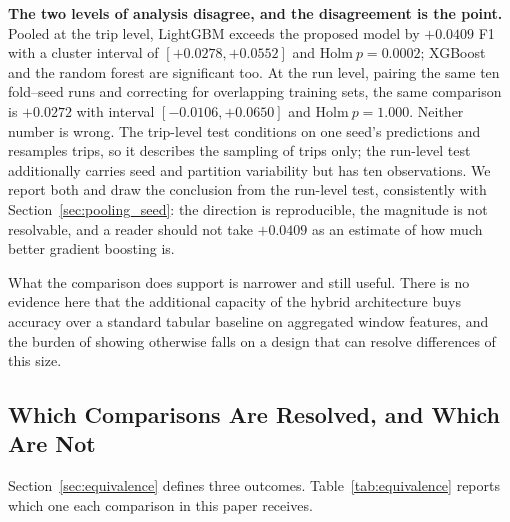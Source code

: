 \documentclass[journal]{IEEEtran}
\begin{document}
\textbf{The two levels of analysis disagree, and the disagreement is the
point.} Pooled at the trip level, LightGBM exceeds the proposed model by
$+0.0409$ F1 with a cluster interval of $[+0.0278, +0.0552]$ and
$\mathrm{Holm}\ p = 0.0002$; XGBoost and the random forest are significant
too. At the run level, pairing the same ten fold--seed runs and correcting for
overlapping training sets, the same comparison is $+0.0272$ with interval
$[-0.0106, +0.0650]$ and $\mathrm{Holm}\ p = 1.000$. Neither number is wrong.
The trip-level test conditions on one seed's predictions and resamples trips,
so it describes the sampling of trips only; the run-level test additionally
carries seed and partition variability but has ten observations. We report
both and draw the conclusion from the run-level test, consistently with
Section~\ref{sec:pooling_seed}: the direction is reproducible, the magnitude
is not resolvable, and a reader should not take $+0.0409$ as an estimate of
how much better gradient boosting is.

What the comparison does support is narrower and still useful. There is no
evidence here that the additional capacity of the hybrid architecture buys
accuracy over a standard tabular baseline on aggregated window features, and
the burden of showing otherwise falls on a design that can resolve differences
of this size.

\subsection{Which Comparisons Are Resolved, and Which Are Not}
\label{sec:equivalence_results}
Section~\ref{sec:equivalence} defines three outcomes. Table~\ref{tab:equivalence}
reports which one each comparison in this paper receives.
\end{document}
